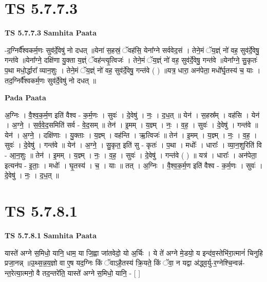\documentclass[17pt]{extarticle}
\begin{document}

\section{ TS 5.7.7.3 }

\textbf{TS 5.7.7.3 } \newline
\textbf{Samhita Paata} \newline

-द॒ग्निर्वै᳚श्वकर्म॒णः सुव॑र्दे॒वेषु॑ नो दधत् ॥येना॑ स॒हस्रं॒ ॅवह॑सि॒ येना᳚ग्ने सर्ववेद॒सं । तेने॒मं ॅय॒ज्ञ्ं नो॑ वह॒ सुव॑र्दे॒वेषु॒ गन्त॑वे ॥येना᳚ग्ने॒ दक्षि॑णा यु॒क्ता य॒ज्ञ्ं ॅवह॑न्त्यृ॒त्विजः॑ । तेने॒मं ॅय॒ज्ञ्ं नो॑ वह॒ सुव॑र्दे॒वेषु॒ गन्त॑वे ॥येना᳚ग्ने॒ सु॒कृतः॑ प॒था मधो॒र्द्धारा᳚ व्यान॒शुः । तेने॒मं ॅय॒ज्ञ्ं नो॑ वह॒ सुव॑र्दे॒वेषु॒ गन्त॑वे ( ) ॥यत्र॒ धारा॒ अन॑पेता॒ मधो᳚र्घृ॒तस्य॑ च॒ याः । तद॒ग्निर्वै᳚श्वकर्म॒णः सुव॑र्दे॒वेषु॑ नो दधत् ॥ \newline

\textbf{Pada Paata} \newline

अ॒ग्निः । वै॒श्व॒क॒र्म॒ण इति॑ वैश्व - क॒र्म॒णः । सुवः॑ । दे॒वेषु॑ । नः॒ । द॒ध॒त् ॥ येन॑ । स॒हस्र᳚म् । वह॑सि । येन॑ । अ॒ग्ने॒ । स॒र्व॒वे॒द॒समिति॑ सर्व - वे॒द॒सम् ॥ तेन॑ । इ॒मम् । य॒ज्ञ्म् । नः॒ । व॒ह॒ । सुवः॑ । दे॒वेषु॑ । गन्त॑वे ॥ येन॑ । अ॒ग्ने॒ । दक्षि॑णाः । यु॒क्ताः । य॒ज्ञ्म् । वह॑न्ति । ऋ॒त्विजः॑ ॥ तेन॑ । इ॒मम् । य॒ज्ञ्म् । नः॒ । व॒ह॒ । सुवः॑ । दे॒वेषु॑ । गन्त॑वे ॥ येन॑ । अ॒ग्ने॒ । सु॒कृत॒ इति॑ सु - कृतः॑ । प॒था । मधोः᳚ । धाराः᳚ । व्या॒न॒शुरिति॑ वि - आ॒न॒शुः ॥ तेन॑ । इ॒मम् । य॒ज्ञ्म् । नः॒ । व॒ह॒ । सुवः॑ । दे॒वेषु॑ । गन्त॑वे ( ) ॥ यत्र॑ । धाराः᳚ । अन॑पेता॒ इत्यन॑प - इ॒ताः॒ । मधोः᳚ । घृ॒तस्य॑ । च॒ । याः ॥ तत् । अ॒ग्निः । वै॒श्व॒क॒र्म॒ण इति॑ वैश्व - क॒र्म॒णः । सुवः॑ । दे॒वेषु॑ । नः॒ । द॒ध॒त् ॥  \newline





\section{ TS 5.7.8.1 }

\textbf{TS 5.7.8.1 } \newline
\textbf{Samhita Paata} \newline

यास्ते॑ अग्ने स॒मिधो॒ यानि॒ धाम॒ या जि॒ह्वा जा॑तवेदो॒ यो अ॒र्चिः । ये ते॑ अग्ने मे॒डयो॒ य इन्द॑व॒स्तेभि॑रा॒त्मानं॑ चिनुहि प्रजा॒नन्न् ॥उ॒थ्स॒न्न॒य॒ज्ञो वा ए॒ष यद॒ग्निः किं ॅवाऽहै॒तस्य॑ क्रि॒यते॒ किं ॅवा॒ न यद्वा अ॑द्ध्व॒र्यु-र॒ग्नेश्चि॒न्वन्न॑-न्त॒रेत्या॒त्मनो॒ वै तद॒न्तरे॑ति॒ यास्ते॑ अग्ने स॒मिधो॒ यानि॒ - [  ] \newline
\end{document}
